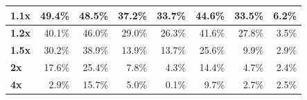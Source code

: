 \begin{table}[h!]
\begin{tabular}{|l|r|r|r|r|r|r|r|}
		\textbf{1.1x}  & 49.4\%                                                                              & 48.5\%                                                                            & 37.2\%                                                                              & 33.7\%                                                                              & 44.6\%                                                                            & 33.5\%                                                                              & 6.2\%                               \\ \hline
		\textbf{1.2x}  & 40.1\%                                                                              & 46.0\%                                                                            & 29.0\%                                                                              & 26.3\%                                                                              & 41.6\%                                                                            & 27.8\%                                                                              & 3.5\%                               \\ \hline
		\textbf{1.5x}  & 30.2\%                                                                              & 38.9\%                                                                            & 13.9\%                                                                              & 13.7\%                                                                              & 25.6\%                                                                            & 9.9\%                                                                               & 2.9\%                               \\ \hline
		\textbf{2x}    & 17.6\%                                                                              & 25.4\%                                                                            & 7.8\%                                                                               & 4.3\%                                                                               & 14.4\%                                                                            & 4.7\%                                                                               & 2.4\%                               \\ \hline
		\textbf{4x}    & 2.9\%                                                                               & 15.7\%                                                                            & 5.0\%                                                                               & 0.1\%                                                                               & 9.7\%                                                                             & 2.7\%                                                                               & 2.5\%                               \\ \hline

\end{tabular}
\end{table}
